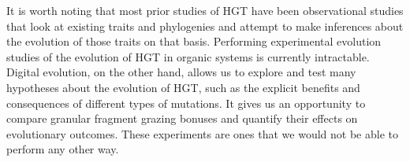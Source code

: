 \documentclass[PhD]{msu-thesis}
\begin{document}
It is worth noting that most prior studies of HGT have been observational studies that look at existing traits and phylogenies and attempt to make inferences about the evolution of those traits on that basis. Performing experimental evolution studies of the evolution of HGT in organic systems is 
currently intractable.  %
Digital evolution, on the other hand, allows us to explore and test many hypotheses about the evolution of HGT, such as the explicit benefits and consequences of different types of mutations.  It gives us an opportunity to compare granular fragment grazing bonuses and quantify their effects on evolutionary outcomes. These experiments are ones that we would not be able to perform any other way.   

\end{document}
